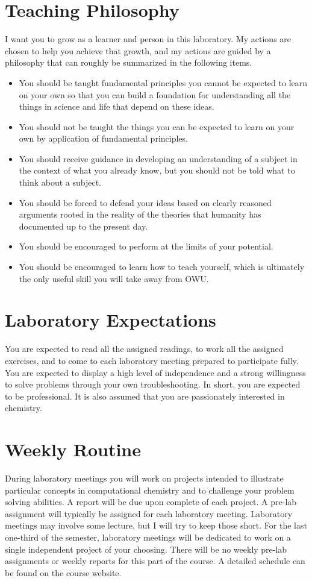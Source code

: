 \documentclass[letterpaper,oneside,onecolumn,11pt,article]{memoir}
\begin{document}
\section{Teaching Philosophy}
I want you to grow as a learner and person in this laboratory. My actions are chosen to help you achieve that growth, and my actions are guided by a philosophy that can roughly be summarized in the following items.
\begin{itemize}
    \item You should be taught fundamental principles you cannot be expected to learn on your own so that you can build a foundation for understanding all the things in science and life that depend on these ideas.
    \item You should not be taught the things you can be expected to learn on your own by application of fundamental principles.
    \item You should receive guidance in developing an
    understanding of a subject in the context of what you already know,
    but you should not be told what to think about a subject.
    \item You should be forced to defend your ideas based on clearly reasoned arguments rooted in the reality of the theories that humanity has documented up to the present day.
    \item You should be encouraged to perform at the limits of your potential.
    \item You should be encouraged to learn how to teach yourself, which is ultimately the only useful skill you will take away from OWU.
\end{itemize}

\section{Laboratory Expectations}
You are expected to read all the assigned readings, to work all the assigned exercises, and to come to each laboratory meeting prepared to participate fully. You are expected to display a high level of independence and a strong willingness to solve problems through your own troubleshooting. In short, you are expected to be professional. It is also assumed that you are passionately interested in chemistry.

\section{Weekly Routine}
During laboratory meetings you will work on projects intended to illustrate particular concepts in computational chemistry and to challenge your problem solving abilities. A report will be due upon complete of each project. A pre-lab assignment will typically be assigned for each laboratory meeting. Laboratory meetings may involve some lecture, but I will try to keep those short. For the last one-third of the semester, laboratory meetings will be dedicated to work on a single independent project of your choosing. There will be no weekly pre-lab assignments or weekly reports for this part of the course. A detailed schedule can be found on the course website.
\end{document}
